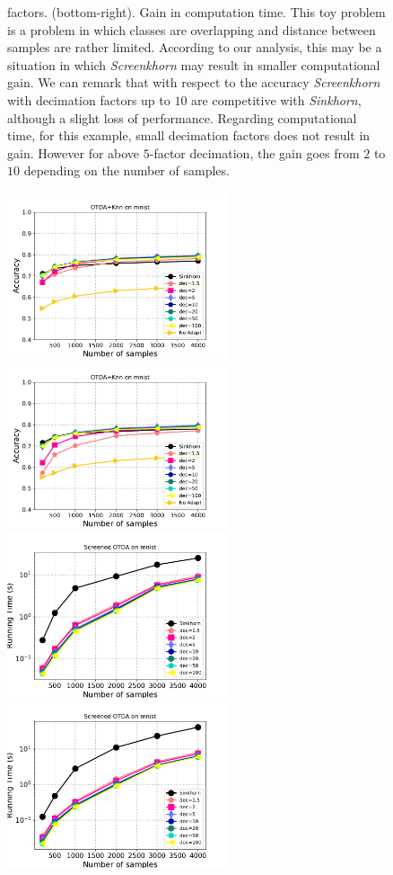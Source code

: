 \begin{figure}[htbp]
{	factors. (bottom-right). Gain in computation time. This toy problem is a problem in which classes are overlapping and distance between samples are rather limited. According to our analysis, this may be a situation in which \emph{Screenkhorn} may
	result in smaller computational gain. We can remark that with respect to the accuracy
	\emph{Screenkhorn} with decimation factors up to $10$ are competitive with \emph{Sinkhorn}, although a slight loss of performance. Regarding computational time, for this example, small decimation factors does not  result in gain. However for above  $5$-factor decimation, the gain goes from  $2$ to $10$ depending on
	the number of samples. 
	\label{fig:otda}}
\end{figure}


\begin{figure}[htbp]
	\centering
	\includegraphics[width=6.5cm]{../../figure/da_accur_mnist_regcl1.pdf}
	\includegraphics[width=6.5cm]{../../figure/da_accur_mnist_regcl10.pdf}
	\includegraphics[width=6.5cm]{../../figure/da_time_mnist_regcl1.pdf}
	\includegraphics[width=6.5cm]{../../figure/da_time_mnist_regcl10.pdf}

\end{figure}
